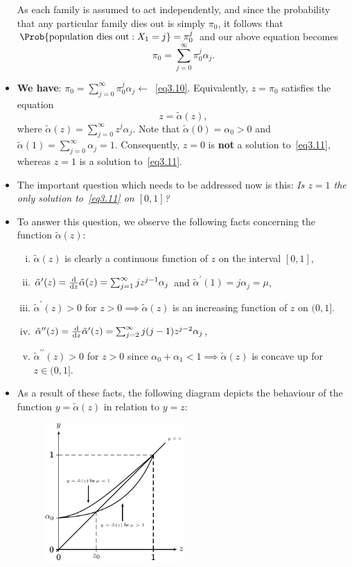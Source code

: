 \begin{itemize}
          As each family is assumed to act independently, and since the probability that any particular
          family dies out is simply $ \pi_0 $, it follows that $ \Prob{\text{population dies out}\given X_1=j}=\pi_0^j $ and our above
          equation becomes
          \[ \pi_0=\sum_{j=0}^{\infty} \pi_0^j \alpha_j.\label{eq3.10}\tag*{(3.10)} \]
    \item \textbf{We have}: $ \pi_0=\sum_{j=0}^{\infty} \pi_0^j \alpha_j \leftarrow $~\ref{eq3.10}. Equivalently, $ z=\pi_0 $ satisfies the equation
          \[ z=\tilde{\alpha}(z),\label{eq3.11}\tag*{(3.11)} \]
          where $ \tilde{\alpha}(z)=\sum_{j=0}^{\infty} z^j \alpha_j $. Note that $ \tilde{\alpha}(0)=\alpha_0>0 $ and $ \tilde{\alpha}(1)=\sum_{j=0}^{\infty} \alpha_j=1 $.
          Consequently, $ z=0 $ is \textbf{not} a solution to~\ref{eq3.11}, whereas $ z=1 $ is a solution to~\ref{eq3.11}.
    \item The important question which needs to be addressed now is this: \emph{Is $ z=1 $ the only solution to~\ref{eq3.11} on $ [0,1] $?}
    \item To answer this question, we observe the following facts concerning the function $ \tilde{\alpha}(z) $:
          \begin{enumerate}[(i)]
              \item $ \tilde{\alpha}(z) $ is clearly a continuous function of $ z $ on the interval $ [0,1] $,
              \item $ \tilde{\alpha}^\prime(z)=\odv*{\tilde{\alpha}(z)}{z}=\sum_{j=1}^{\infty} jz^{j-1}\alpha_j $ and $ \tilde{\alpha}^\prime(1)=j\alpha_j=\mu $,
              \item $ \tilde{\alpha}^\prime(z)>0 $ for $ z>0\implies \tilde{\alpha}(z) $ is an increasing function of $ z $ on $ (0,1] $.%
              \item $ \tilde{\alpha}^{\prime\prime}(z)=\odv*{\tilde{\alpha}^\prime(z)}{z}=\sum_{j=2}^{\infty} j(j-1)z^{j-2}\alpha_j $,
              \item $ \tilde{\alpha}^{\prime\prime}(z)>0 $ for $ z>0 $ since $ \alpha_0+\alpha_1<1\implies \tilde{\alpha}(z) $ is concave up for $ z\in(0,1] $.%
          \end{enumerate}
    \item As a result of these facts, the following diagram depicts the behaviour of the function $ y=\tilde{\alpha}(z) $ in relation to $ y=z $:
          \begin{figure}[!htbp]
              \centering
              \includegraphics[width=0.5\textwidth]{figures/3.4f1.pdf}

\end{figure}
\end{itemize}
